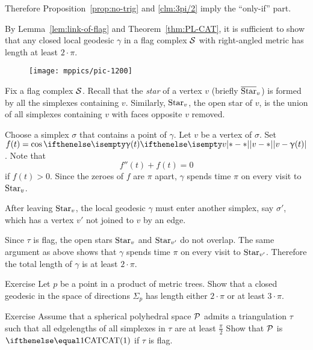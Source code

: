 Therefore Proposition~\ref{prop:no-trig} and \ref{clm:3pi/2} 
imply the ``only-if'' part.

By Lemma~\ref{lem:link-of-flag} and Theorem~\ref{thm:PL-CAT},
it is sufficient to show that any closed local geodesic $\gamma$ 
in a flag complex $\mathcal{S}$ with right-angled metric has length at least $2\cdot\pi$.

\begin{wrapfigure}{o}{45mm}
\vskip-2mm
\centering
\texttt{[image: mppics/pic-1200]}
\end{wrapfigure}

Fix a flag complex $\mathcal{S}$.
Recall that the  \emph{star} of a vertex $v$ (briefly $\overline {\mathop{\rm Star}\nolimits}_v$)
is formed by all the simplexes  containing $v$. Similarly, $\mathop{\rm Star}\nolimits_v$,   the open star of $v$, is the union of all simplexes containing $v$ with faces opposite $v$ removed.

Choose a simplex $\sigma$ that contains a point of $\gamma$.
Let $v$ be a vertex of $\sigma$.
Set $f(t)=\cos\dist{v}{\gamma(t)}{}$.
Note that 
\[f''(t)+f(t)=0\] if $f(t)>0$.  
Since the zeroes of $f$ are  $\pi$ apart,
$\gamma$ 
spends time $\pi$ on every visit to $\mathop{\rm Star}\nolimits_v$.

After leaving $\mathop{\rm Star}\nolimits_v$,
the local geodesic $\gamma$ must enter another simplex, 
say $\sigma'$, 
which has a vertex $v'$ not joined to $v$ by an edge.

Since $\tau$ is flag, the open  stars $\mathop{\rm Star}\nolimits_v$ and $\mathop{\rm Star}\nolimits_{v'}$
do not overlap.
The same argument as above shows that $\gamma$ spends time $\pi$ on every visit to $\mathop{\rm Star}\nolimits_{v'}$.
Therefore the total length of $\gamma$ is at least $2\cdot\pi$.
\qeds

\begin{thm}{Exercise}\label{ex:tree-product}
Let $p$ be a point in a product of metric trees.
Show that a closed geodesic in the space of directions $\Sigma_p$ has length either $2\cdot\pi$ or at least $3\cdot\pi$.
\end{thm}


\begin{thm}{Exercise}\label{ex:obtuce-flag}
Assume that a spherical polyhedral space $\mathcal{P}$
admits a triangulation $\tau$ such that all edgelengths of all simplexes in $\tau$ are at least $\tfrac\pi2$
Show that $\mathcal{P}$ is $\CAT{1}$
if $\tau$ is flag.
\end{thm}

